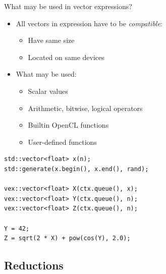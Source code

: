 \documentclass[@BEAMER_OPTIONS@]{beamer}
\begin{document}
\begin{frame}[fragile]{What may be used in vector expressions?}
    \begin{itemize}
        \item All vectors in expression have to be \emph{compatible}:
            \begin{itemize}
                \item Have same size
                \item Located on same devices
            \end{itemize}
        \item What may be used:
            \begin{itemize}
                \item Scalar values
                \item Arithmetic, bitwise, logical operators
                \item Builtin OpenCL functions
                \item User-defined functions
            \end{itemize}
    \end{itemize}
    \begin{exampleblock}{}
        \begin{lstlisting}
std::vector<float> x(n);
std::generate(x.begin(), x.end(), rand);

vex::vector<float> X(ctx.queue(), x);
vex::vector<float> Y(ctx.queue(), n);
vex::vector<float> Z(ctx.queue(), n);

Y = 42;
Z = sqrt(2 * X) + pow(cos(Y), 2.0);
        \end{lstlisting}
    \end{exampleblock}
\end{frame}


\subsection{Reductions}
\end{document}
